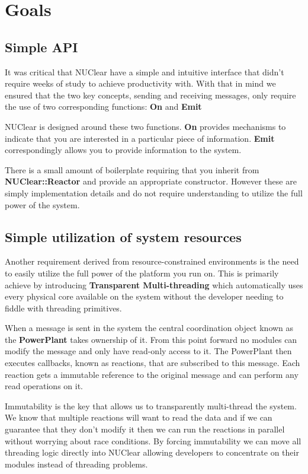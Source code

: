 \documentclass[english,12pt]{scrartcl}
\begin{document}
	\section{Goals}
		\subsection{Simple API}
			It was critical that NUClear have a simple and intuitive interface that didn't require weeks of study to achieve productivity with.
			With that in mind we ensured that the two key concepts, sending and receiving messages, only require the use of two corresponding functions: \textbf{On} and \textbf{Emit}
			
			NUClear is designed around these two functions. \textbf{On} provides mechanisms to indicate that you are interested in a particular piece of information.
			\textbf{Emit} correspondingly allows you to provide information to the system.
			
			There is a small amount of boilerplate requiring that you inherit from \textbf{NUClear::Reactor} and provide an appropriate constructor.
			However these are simply implementation details and do not require understanding to utilize the full power of the system.
		
		\subsection{Simple utilization of system resources}
			Another requirement derived from resource-constrained environments is the need to easily utilize the full power of the platform you run on.
			This is primarily achieve by introducing \textbf{Transparent Multi-threading} which automatically uses every physical core available on the system
			without the developer needing to fiddle with threading primitives.
			
			When a message is sent in the system the central coordination object known as the \textbf{PowerPlant} takes ownership of it. 
			From this point forward no modules can modify the message and only have read-only access to it.
			The PowerPlant then executes callbacks, known as reactions, that are subscribed to this message.
			Each reaction gets a immutable reference to the original message and can perform any read operations on it.
			
			Immutability is the key that allows us to transparently multi-thread the system.
			We know that multiple reactions will want to read the data and if we can guarantee that they don't modify it then we can
			run the reactions in parallel without worrying about race conditions.
			By forcing immutability we can move all threading logic directly into NUClear allowing developers to concentrate on their modules
			instead of threading problems.
			
\end{document}
